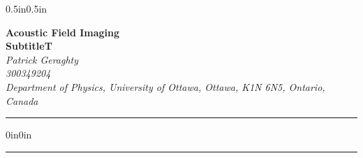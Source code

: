 \documentclass[12pt,a4paper]{article}
\begin{document}
    \footnotesize

    \begin{adjustwidth*}{0.5in}{0.5in}
        \begin{center}
            \textbf{\Large Acoustic Field Imaging}\\[0.5em]
            \textbf{SubtitleT}\\[1.5em]
            \textit{Patrick Geraghty}\\
            \textit{300349204} \\
            \textit{Department of Physics, University of Ottawa, Ottawa, K1N 6N5, Ontario, Canada}\\[1em]

            \begin{center}
                \rule{0.5\linewidth}{0.5pt}
            \end{center}

            \begin{adjustwidth}{0in}{0in}
                
            \end{adjustwidth}
        \end{center}
    \end{adjustwidth*}

    \begin{center}
        \rule{0.5\linewidth}{0.5pt}
    \end{center}

    \setlength{\columnsep}{2em}
\end{document}
